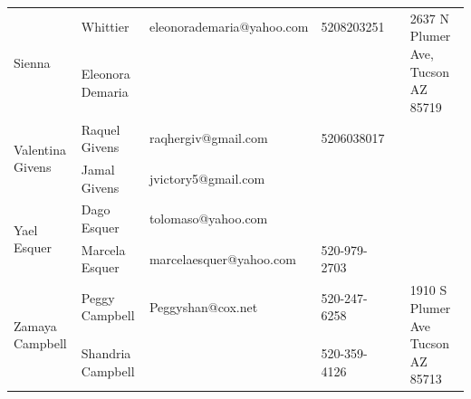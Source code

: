 \documentclass[landscape]{article}\usepackage[]{graphicx}\usepackage[]{color}
\begin{document}
\begin{longtable}{|p{100pt}|p{100pt}|p{140pt}|p{60pt}|p{64pt}|p{120pt}|}
\hline
\multirow{2}{100pt}{Sienna} & Whittier & eleonorademaria@yahoo.com & 5208203251 &  & \multirow{2}{120pt}{2637 N Plumer Ave, Tucson AZ 85719} \\
 & Eleonora Demaria &  &  &  & \\
\hline
\multirow{2}{100pt}{Valentina Givens} & Raquel Givens & raqhergiv@gmail.com & 5206038017 &  & \multirow{2}{120pt}{} \\
 & Jamal Givens & jvictory5@gmail.com &  &  & \\
\hline
\multirow{2}{100pt}{Yael Esquer} & Dago Esquer & tolomaso@yahoo.com &  &  & \multirow{2}{120pt}{} \\
 & Marcela Esquer & marcelaesquer@yahoo.com & 520-979-2703 &  & \\
\hline
\multirow{2}{100pt}{Zamaya Campbell } & Peggy Campbell  & Peggyshan@cox.net & 520-247-6258 &  & \multirow{2}{120pt}{1910 S Plumer Ave Tucson AZ 85713} \\
 & Shandria Campbell  &  & 520-359-4126 &  & \\
\hline
\end{longtable}
\newpage
\end{document}
